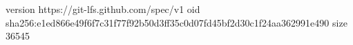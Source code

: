 version https://git-lfs.github.com/spec/v1
oid sha256:e1ed866e49f6f7c31f77f92b50d3ff35c0d07fd45bf2d30c1f24aa362991e490
size 36545
